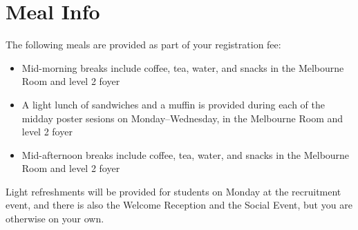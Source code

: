 \setheaders{}{}
\section{Meal Info}{}

The following meals are provided as part of your registration fee:

\begin{itemize}
\item Mid-morning breaks include coffee, tea, water, and snacks
	in the Melbourne Room and level 2 foyer
\item A light lunch of sandwiches and a muffin is provided during each
	of the midday poster sesions on Monday--Wednesday,
	in the Melbourne Room and level 2 foyer
\item Mid-afternoon breaks include coffee, tea, water, and 
	snacks in the Melbourne Room and level 2 foyer
\end{itemize}

Light refreshments will be provided for students on Monday at the
recruitment event, and there is also the Welcome Reception and the
Social Event, but you are otherwise on your own.

